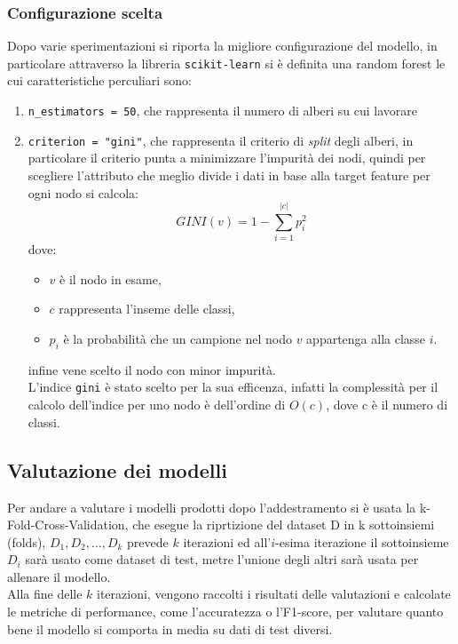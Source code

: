\documentclass[italian,12pt,a4paper]{article}
\begin{document}
	\subsubsection{Configurazione scelta}
	Dopo varie sperimentazioni si riporta la migliore configurazione del modello, in particolare attraverso la libreria \texttt{scikit-learn} \cite{scikit_learn} si è definita una random forest le cui caratteristiche perculiari sono:
		\begin{enumerate}
			\item \texttt{n\_estimators = 50}, che rappresenta il numero di alberi su cui lavorare
			\item  \texttt{criterion = "gini"}, che rappresenta il criterio di \textit{split} degli alberi, in particolare il criterio punta a minimizzare l'impurità dei nodi, quindi per scegliere l'attributo che meglio divide i dati in base alla target feature per ogni nodo si calcola:
				$$GINI(v) = 1-\sum_{i = 1}^{|c|}p_i^2$$
			dove:
				\begin{itemize}
					\item $v$ è il nodo in esame,
					\item $c$ rappresenta l'inseme delle classi,
					\item $p_i$ è la probabilità che un campione nel nodo $v$ appartenga alla classe $i$.
				\end{itemize}
			infine vene scelto il nodo con minor impurità. \\
			\linebreak
			L'indice \texttt{gini} è stato scelto per la sua efficenza, infatti la complessità per il calcolo dell'indice per uno nodo è dell'ordine di $O(c)$, dove c è il numero di classi.
			
		\end{enumerate}
	
	\subsection{Valutazione dei modelli}
	Per andare a valutare i modelli prodotti dopo l'addestramento si è usata la k-Fold-Cross-Validation, che esegue la riprtizione del dataset D in k sottoinsiemi (folds), $D_1, D_2, \dots , D_k$ prevede $k$ iterazioni ed all'$i$-esima iterazione il sottoinsieme $D_i$ sarà usato come dataset di test, metre l'unione degli altri sarà usata per allenare il modello. \\
	\linebreak
	Alla fine delle $k$ iterazioni, vengono raccolti i risultati delle valutazioni e calcolate le metriche di performance, come l'accuratezza o l'F1-score, per valutare quanto bene il modello si comporta in media su dati di test diversi.
\end{document}
